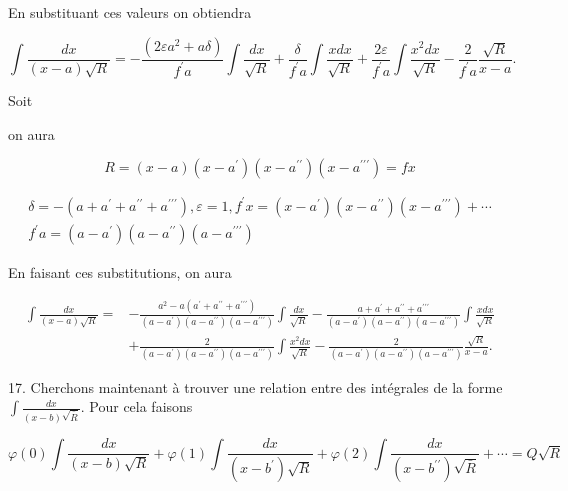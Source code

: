 \documentclass{article}
\begin{document}
En substituant ces valeurs on obtiendra

\[
\int \frac{d x}{(x-a) \sqrt{R}}=-\frac{\left(2 \varepsilon a^{2}+a \delta\right)}{f^{\prime} a} \int \frac{d x}{\sqrt{R}}+\frac{\delta}{f^{\prime} a} \int \frac{x d x}{\sqrt{R}}+\frac{2 \varepsilon}{f^{\prime} a} \int \frac{x^{2} d x}{\sqrt{R}}-\frac{2}{f^{\prime} a} \frac{\sqrt{R}}{x-a} .
\]

Soit

on aura

\[
R=(x-a)\left(x-a^{\prime}\right)\left(x-a^{\prime \prime}\right)\left(x-a^{\prime \prime \prime}\right)=f x
\]

\[
\begin{gathered}
\delta=-\left(a+a^{\prime}+a^{\prime \prime}+a^{\prime \prime \prime}\right), \varepsilon=1, f^{\prime} x=\left(x-a^{\prime}\right)\left(x-a^{\prime \prime}\right)\left(x-a^{\prime \prime \prime}\right)+\cdots \\
f^{\prime} a=\left(a-a^{\prime}\right)\left(a-a^{\prime \prime}\right)\left(a-a^{\prime \prime \prime}\right)
\end{gathered}
\]

En faisant ces substitutions, on aura

\[
\begin{aligned}
\int \frac{d x}{(x-a) \sqrt{R}}= & -\frac{a^{2}-a\left(a^{\prime}+a^{\prime \prime}+a^{\prime \prime \prime}\right)}{\left(a-a^{\prime}\right)\left(a-a^{\prime \prime}\right)\left(a-a^{\prime \prime \prime}\right)} \int \frac{d x}{\sqrt{R}}-\frac{a+a^{\prime}+a^{\prime \prime}+a^{\prime \prime \prime}}{\left(a-a^{\prime}\right)\left(a-a^{\prime \prime}\right)\left(a-a^{\prime \prime \prime}\right)} \int \frac{x d x}{\sqrt{R}} \\
& +\frac{2}{\left(a-a^{\prime}\right)\left(a-a^{\prime \prime}\right)\left(a-a^{\prime \prime \prime}\right)} \int \frac{x^{2} d x}{\sqrt{R}}-\frac{2}{\left(a-a^{\prime}\right)\left(a-a^{\prime \prime}\right)\left(a-a^{\prime \prime \prime}\right)} \frac{\sqrt{R}}{x-a} .
\end{aligned}
\]

17. Cherchons maintenant à trouver une relation entre des intégrales de la forme \(\int \frac{d x}{(x-b) \sqrt{\bar{R}}}\). Pour cela faisons

\[
\varphi(0) \int \frac{d x}{(x-b) \sqrt{R}}+\varphi(1) \int \frac{d x}{\left(x-b^{\prime}\right) \sqrt{R}}+\varphi(2) \int \frac{d x}{\left(x-b^{\prime \prime}\right) \sqrt{\bar{R}}}+\cdots=Q \sqrt{R}
\]
\end{document}
